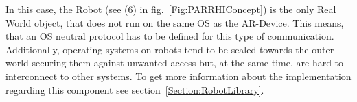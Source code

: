 In this case, the Robot (see (6) in fig.~\ref{Fig:PARRHIConcept}) is the only Real World object, that does not run on the same OS as the AR-Device. This means, that an OS neutral protocol has to be defined for this type of communication. Additionally, operating systems on robots tend to be sealed towards the outer world securing them against unwanted access but, at the same time, are hard to interconnect to other systems. To get more information about the implementation regarding this component see section~\ref{Section:RobotLibrary}.


























